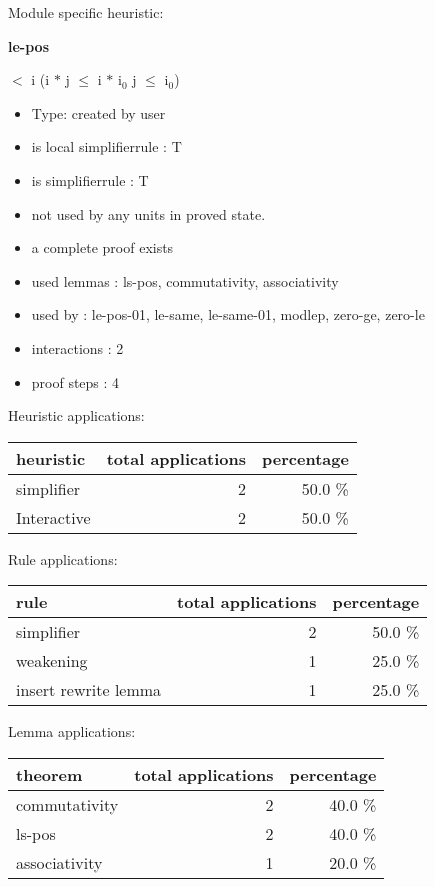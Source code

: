 \documentclass[a4paper]{article}
\begin{document}
Module specific heuristic:

\pagebreak

{\LARGE\bf le-pos}\label{lemma-le-pos}

\medskip

  $<$ i \Imp (i $*$ j $\le$ i $*$ $\mbox{i}_{0}$ \Equiv j $\le$ $\mbox{i}_{0}$)

\begin{itemize}

\item Type: created by user

\item is local simplifierrule : T
\item is simplifierrule : T
\item not used by any units in proved state.
\item       a complete proof exists
\item       used lemmas  : ls-pos, commutativity, associativity
\item       used by      : le-pos-01, le-same, le-same-01, modlep, zero-ge, zero-le
\item       interactions : 2
\item       proof steps  : 4
\end{itemize}

\medskip


Heuristic applications:

\begin{supertabular}{l|r|r}
heuristic	& total applications & percentage \\ \hline
simplifier & 2 & 50.0 \% \\
Interactive & 2 & 50.0 \% \\

\end{supertabular}

Rule applications:

\begin{supertabular}{l|r|r}
rule	        & total applications & percentage \\ \hline
simplifier & 2 & 50.0 \% \\
weakening & 1 & 25.0 \% \\
insert rewrite lemma & 1 & 25.0 \% \\

\end{supertabular}

Lemma applications:

\begin{supertabular}{l|r|r}
theorem	        & total applications & percentage \\ \hline
commutativity & 2 & 40.0 \% \\
ls-pos & 2 & 40.0 \% \\
associativity & 1 & 20.0 \% \\

\end{supertabular}
\end{document}
